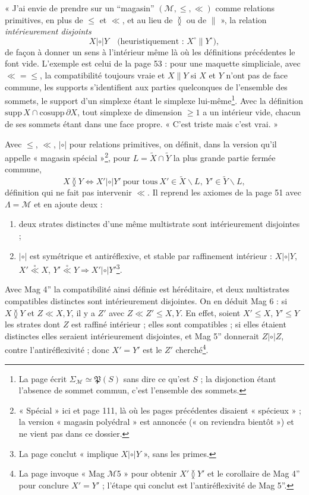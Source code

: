 \documentclass[11pt,a4paper]{article}
\begin{document}
« J'ai envie de prendre sur un “magasin” $(\mathcal{M}, \leq, \ll)$ comme
relations primitives, en plus de $\leq$ et $\ll$, et au lieu de $\between$ ou de
$\parallel$ », la relation \emph{intérieurement disjoints}
\[
X \mathrel{|{\circ}|} Y \quad \text{(heuristiquement : } X^{\circ} \parallel Y^{\circ}) ,
\]
de façon à donner un sens à l'intérieur même là où les définitions précédentes le
font vide. L'exemple est celui de la page 53 : pour une maquette simpliciale, avec
$\ll = \leq$, la compatibilité toujours vraie et $X \parallel Y$ si $X$ et $Y$
n'ont pas de face commune, les supports s'identifient aux parties quelconques de
l'ensemble des sommets, le support d'un simplexe étant le simplexe
lui-même\footnote{La page écrit $\Sigma_{\mathcal{M}} \simeq \mathfrak{P}(S)$ sans
dire ce qu'est $S$ ; la disjonction étant l'absence de sommet commun, c'est
l'ensemble des sommets.}. Avec la définition $\mathrm{supp}\, X \cap
\mathrm{cosupp}\, \partial X$, tout simplexe de dimension $\geq 1$ a un intérieur
vide, chacun de ses sommets étant dans une face propre. « C'est triste mais c'est
vrai. »

Avec $\leq$, $\ll$, $\mathrel{|{\circ}|}$ pour relations primitives, on définit,
dans la version qu'il appelle « magasin spécial »\footnote{« Spécial » ici et
page 111, là où les pages précédentes disaient « spécieux » ; la version
« magasin polyédral » est annoncée (« on reviendra bientôt ») et ne vient pas
dans ce dossier.}, pour $L = \widetilde{X} \cap \widetilde{Y}$ la plus grande partie
fermée commune,
\[
X \between Y \iff X' \mathrel{|{\circ}|} Y' \ \text{pour tous}\ X' \in \widetilde{X}
\smallsetminus L,\ Y' \in \widetilde{Y} \smallsetminus L ,
\]
définition qui ne fait pas intervenir $\ll$. Il reprend les axiomes de la page 51
avec $\Lambda = \mathcal{M}$ et en ajoute deux :
\begin{enumerate}
\item[\textbf{Mag 4''}] deux strates distinctes d'une même multistrate sont
intérieurement disjointes ;
\item[\textbf{Mag 5''}] $\mathrel{|{\circ}|}$ est symétrique et antiréflexive, et
stable par raffinement intérieur : $X \mathrel{|{\circ}|} Y$, $X'
\mathrel{\overset{\circ}{\ll}} X$, $Y' \mathrel{\overset{\circ}{\ll}} Y \Rightarrow
X' \mathrel{|{\circ}|} Y'$\footnote{La page conclut « implique $X
\mathrel{|{\circ}|} Y$ », sans les primes.}.
\end{enumerate}
Avec Mag 4'' la compatibilité ainsi définie est héréditaire, et deux multistrates
compatibles distinctes sont intérieurement disjointes. On en déduit Mag 6 : si $X
\between Y$ et $Z \ll X, Y$, il y a $Z'$ avec $Z \ll Z' \leq X, Y$. En effet, soient
$X' \leq X$, $Y' \leq Y$ les strates dont $Z$ est raffiné intérieur ; elles sont
compatibles ; si elles étaient distinctes elles seraient intérieurement disjointes,
et Mag 5'' donnerait $Z \mathrel{|{\circ}|} Z$, contre l'antiréflexivité ; donc $X'
= Y'$ est le $Z'$ cherché\footnote{La page invoque « Mag $\mathcal{M}$5 » pour
obtenir $X' \between Y'$ et le corollaire de Mag 4'' pour conclure $X' = Y'$ ;
l'étape qui conclut est l'antiréflexivité de Mag 5''.}.
\end{document}
